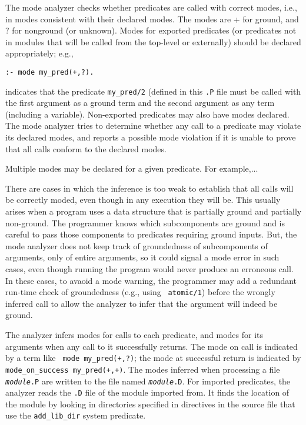 \begin{description}
        The mode analyzer checks whether predicates are called with
        correct modes, i.e., in modes consistent with their declared
        modes.  The modes are + for ground, and ? for nonground (or
        unknown).  Modes for exported predicates (or predicates not in
        modules that will be called from the top-level or externally)
        should be declared appropriately; e.g.,
\begin{verbatim}
:- mode my_pred(+,?).
\end{verbatim}
	indicates that the predicate {\tt my\_pred/2} (defined in this
        {\tt .P} file must be called with the first argument as a
        ground term and the second argument as any term (including a
        variable).  Non-exported predicates may also have modes
        declared.  The mode analyzer tries to determine whether any
        call to a predicate may violate its declared modes, and
        reports a possible mode violation if it is unable to prove
        that all calls conform to the declared modes.

        Multiple modes may be declared for a given predicate.  For
        example,...

        There are cases in which the inference is too weak to
        establish that all calls will be correctly moded, even though
        in any execution they will be.  This usually arises when a
        program uses a data structure that is partially ground and
        partially non-ground.  The programmer knows which
        subcomponents are ground and is careful to pass those
        components to predicates requiring ground inputs.  But, the
        mode analyzer does not keep track of groundedness of
        subcomponents of arguments, only of entire arguments, so it
        could signal a mode error in such cases, even though running
        the program would never produce an erroneous call.  In these
        cases, to avaoid a mode warning, the programmer may add a
        redundant run-time check of groundedness (e.g., using {\tt
          atomic/1}) before the wrongly inferred call to allow the
        analyzer to infer that the argument will indeed be ground.

        The analyzer infers modes for calls to each predicate, and
        modes for its arguments when any call to it successfully
        returns.  The mode on call is indicated by a term like {\tt
          mode my\_pred(+,?)}; the mode at successful return is
        indicated by {\tt mode\_on\_success my\_pred(+,+)}.  The modes
        inferred when processing a file {\tt {\em module}.P} are
        written to the file named {\tt {\em module}.D}.  For imported
        predicates, the analyzer reads the {\tt .D} file of the module
        imported from.  It finds the location of the module by looking
        in directories specified in directives in the source file that
        use the {\tt add\_lib\_dir} system predicate.


\end{description}
